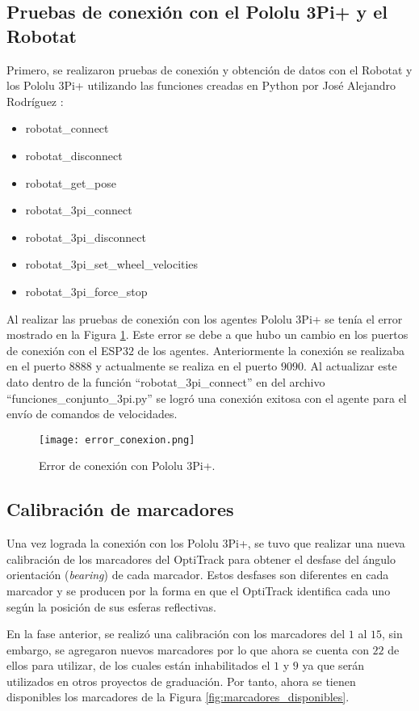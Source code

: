 \subsection{Pruebas de conexión con el Pololu 3Pi+ y el Robotat}
 Primero, se realizaron pruebas de conexión y obtención de datos con el Robotat y los Pololu 3Pi+ utilizando las funciones creadas en Python por José Alejandro Rodríguez \cite{RodriguezJA_2023_tesis}:
\begin{itemize}
	\item robotat\_connect
	\item robotat\_disconnect
	\item robotat\_get\_pose
	\item robotat\_3pi\_connect
	\item robotat\_3pi\_disconnect
	\item robotat\_3pi\_set\_wheel\_velocities
	\item robotat\_3pi\_force\_stop
\end{itemize}

Al realizar las pruebas de conexión con los agentes Pololu 3Pi+ se tenía el error mostrado en la Figura \ref{fig:error_conexion}. Este error se debe a que hubo un cambio en los puertos de conexión con el ESP$32$ de los agentes. Anteriormente la conexión se realizaba en el puerto $8888$ y actualmente se realiza en el puerto $9090$. Al actualizar este dato dentro de la función ``robotat\_3pi\_connect''  en del archivo ``funciones\_conjunto\_3pi.py'' se logró una conexión exitosa con el agente para el envío de comandos de velocidades.

\begin{figure}[H]
	\centering
	\texttt{[image: error\_conexion.png]}
	\caption{Error de conexión con Pololu 3Pi+.}
	\label{fig:error_conexion}
\end{figure}

\subsection{Calibración de marcadores}
Una vez lograda la conexión con los Pololu 3Pi+, se tuvo que realizar una nueva calibración de los marcadores del OptiTrack para obtener el desfase del ángulo orientación (\textit{bearing}) de cada marcador. Estos desfases son diferentes en cada marcador y se producen por la forma en que el OptiTrack identifica cada uno según la posición de sus esferas reflectivas.

En la fase anterior, se realizó una calibración con los marcadores del $1$ al $15$, sin embargo, se agregaron nuevos marcadores por lo que ahora se cuenta con $22$ de ellos para utilizar, de los cuales están inhabilitados el $1$ y $9$ ya que serán utilizados en otros proyectos de graduación. Por tanto, ahora se tienen disponibles los marcadores de la Figura \ref{fig:marcadores_disponibles}. 

